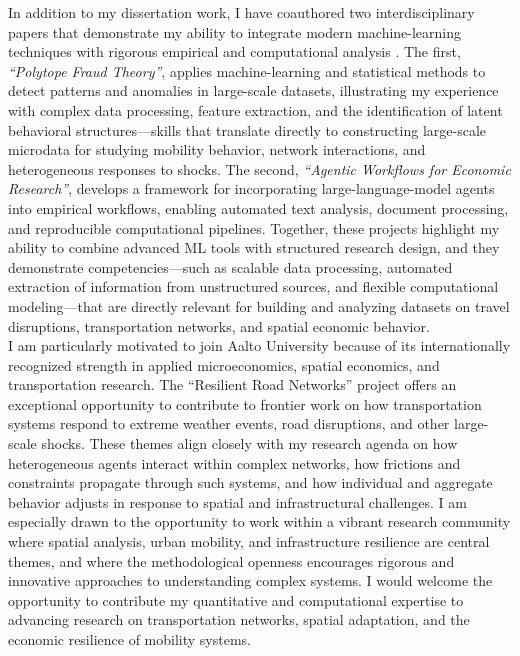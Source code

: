 \documentclass{nfr}
\begin{document}
In addition to my dissertation work, I have coauthored two interdisciplinary papers that demonstrate my ability to integrate modern machine-learning techniques with rigorous empirical and computational analysis \citep{Zhao2025, Dawid2025}. 
The first, \textit{“Polytope Fraud Theory”}, applies machine-learning and statistical methods to detect patterns and anomalies in large-scale datasets, illustrating my experience with complex data processing, feature extraction, and the identification of latent behavioral structures—skills that translate directly to constructing large-scale microdata for studying mobility behavior, network interactions, and heterogeneous responses to shocks. 
The second, \textit{“Agentic Workflows for Economic Research”}, develops a framework for incorporating large-language-model agents into empirical workflows, enabling automated text analysis, document processing, and reproducible computational pipelines. 
Together, these projects highlight my ability to combine advanced ML tools with structured research design, and they demonstrate competencies—such as scalable data processing, automated extraction of information from unstructured sources, and flexible computational modeling—that are directly relevant for building and analyzing datasets on travel disruptions, transportation networks, and spatial economic behavior.\\

I am particularly motivated to join Aalto University because of its internationally recognized strength in applied microeconomics, spatial economics, and transportation research. 
The “Resilient Road Networks” project offers an exceptional opportunity to contribute to frontier work on how transportation systems respond to extreme weather events, road disruptions, and other large-scale shocks. 
These themes align closely with my research agenda on how heterogeneous agents interact within complex networks, how frictions and constraints propagate through such systems, and how individual and aggregate behavior adjusts in response to spatial and infrastructural challenges. 
I am especially drawn to the opportunity to work within a vibrant research community where spatial analysis, urban mobility, and infrastructure resilience are central themes, and where the methodological openness encourages rigorous and innovative approaches to understanding complex systems. 
I would welcome the opportunity to contribute my quantitative and computational expertise to advancing research on transportation networks, spatial adaptation, and the economic resilience of mobility systems.\\
\end{document}
